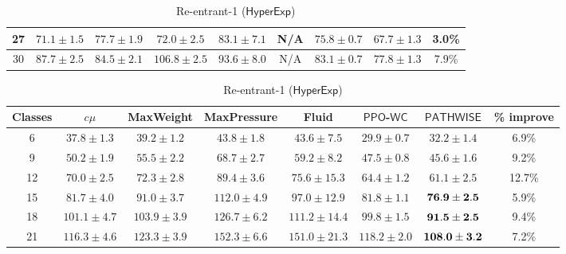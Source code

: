 \begin{table}[h!]
\begin{tabular}{ccccccccc}
\midrule 
{\footnotesize{}27 } & {\footnotesize{}$71.1\pm1.5$ } & {\footnotesize{}$77.7\pm1.9$ } & {\footnotesize{}$72.0\pm2.5$ } & {\footnotesize{}$83.1\pm7.1$} & {\footnotesize{}N/A} & {\footnotesize{}$75.8\pm0.7$ } & {\footnotesize{}$\mathbf{67.7\pm1.3}$ } & {\footnotesize{}3.0\%}\tabularnewline
\midrule 
{\footnotesize{}30 } & {\footnotesize{}$87.7\pm2.5$ } & {\footnotesize{}$84.5\pm2.1$ } & {\footnotesize{}$106.8\pm2.5$ } & {\footnotesize{}$93.6\pm8.0$} & {\footnotesize{}N/A} & {\footnotesize{}$83.1\pm0.7$ } & {\footnotesize{}$\mathbf{77.8\pm1.3}$ } & {\footnotesize{}7.9\%}\tabularnewline
\bottomrule
\end{tabular}
\vspace{1em}
 \caption{Re-entrant-1 ($\mathsf{HyperExp}$)}
\begin{tabular}{cccccccc}
\toprule 
{\footnotesize{}Classes} & {\footnotesize{}$c\mu$ } & {\footnotesize{}MaxWeight } & {\footnotesize{}MaxPressure} & {\footnotesize{}Fluid } & {\footnotesize{}$\mathsf{PPO}$-$\mathsf{WC}$} & {\footnotesize{}$\mathsf{PATHWISE}$} & {\footnotesize{}\% improve}\tabularnewline
\midrule 
{\footnotesize{}6} & {\footnotesize{}$37.8\pm1.3$} & {\footnotesize{}$39.2\pm1.2$} & {\footnotesize{}$43.8\pm1.8$} & {\footnotesize{}$43.6\pm7.5$} & {\footnotesize{}$\mathbf{29.9\pm0.7}$} & {\footnotesize{}$32.2\pm1.4$ } & {\footnotesize{}6.9\%}\tabularnewline
\midrule 
{\footnotesize{}9} & {\footnotesize{}$50.2\pm1.9$} & {\footnotesize{}$55.5\pm2.2$} & {\footnotesize{}$68.7\pm2.7$} & {\footnotesize{}$59.2\pm8.2$} & {\footnotesize{}$\mathbf{47.5\pm0.8}$} & {\footnotesize{}$\mathbf{45.6\pm1.6}$ } & {\footnotesize{}9.2\%}\tabularnewline
\midrule 
{\footnotesize{}12 } & {\footnotesize{}$70.0\pm2.5$} & {\footnotesize{}$72.3\pm2.8$} & {\footnotesize{}$89.4\pm3.6$} & {\footnotesize{}$75.6\pm15.3$} & {\footnotesize{}$64.4\pm1.2$} & {\footnotesize{}$\mathbf{61.1\pm2.5}$ } & {\footnotesize{}12.7\%}\tabularnewline
\midrule 
{\footnotesize{}15 } & {\footnotesize{}$81.7\pm4.0$} & {\footnotesize{}$91.0\pm3.7$} & {\footnotesize{}$112.0\pm4.9$} & {\footnotesize{}$97.0\pm12.9$} & {\footnotesize{}$81.8\pm1.1$} & {\footnotesize{}${\bf 76.9\pm2.5}$ } & {\footnotesize{}5.9\%}\tabularnewline
\midrule 
{\footnotesize{}18 } & {\footnotesize{}$101.1\pm4.7$} & {\footnotesize{}$103.9\pm3.9$} & {\footnotesize{}$126.7\pm6.2$} & {\footnotesize{}$111.2\pm14.4$} & {\footnotesize{}$99.8\pm1.5$} & {\footnotesize{}${\bf 91.5\pm2.5}$ } & {\footnotesize{}9.4\%}\tabularnewline
\midrule 
{\footnotesize{}21 } & {\footnotesize{}$116.3\pm4.6$} & {\footnotesize{}$123.3\pm3.9$} & {\footnotesize{}$152.3\pm6.6$} & {\footnotesize{}$151.0\pm21.3$} & {\footnotesize{}$118.2\pm2.0$} & {\footnotesize{}${\bf 108.0\pm3.2}$ } & {\footnotesize{}7.2\%}\tabularnewline
\bottomrule
\end{tabular}
\end{table}

